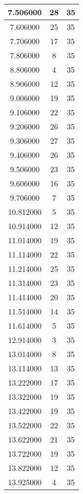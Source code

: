 \begin{longtable}[htbp]{|c|c|c|}
7.506000 & 28 & 35 \\ \hline
7.606000 & 25 & 35 \\ \hline
7.706000 & 17 & 35 \\ \hline
7.806000 & 8 & 35 \\ \hline
8.806000 & 4 & 35 \\ \hline
8.906000 & 12 & 35 \\ \hline
9.006000 & 19 & 35 \\ \hline
9.106000 & 22 & 35 \\ \hline
9.206000 & 26 & 35 \\ \hline
9.306000 & 27 & 35 \\ \hline
9.406000 & 26 & 35 \\ \hline
9.506000 & 23 & 35 \\ \hline
9.606000 & 16 & 35 \\ \hline
9.706000 & 7 & 35 \\ \hline
10.812000 & 5 & 35 \\ \hline
10.914000 & 12 & 35 \\ \hline
11.014000 & 19 & 35 \\ \hline
11.114000 & 22 & 35 \\ \hline
11.214000 & 25 & 35 \\ \hline
11.314000 & 23 & 35 \\ \hline
11.414000 & 20 & 35 \\ \hline
11.514000 & 14 & 35 \\ \hline
11.614000 & 5 & 35 \\ \hline
12.914000 & 3 & 35 \\ \hline
13.014000 & 8 & 35 \\ \hline
13.114000 & 13 & 35 \\ \hline
13.222000 & 17 & 35 \\ \hline
13.322000 & 19 & 35 \\ \hline
13.422000 & 19 & 35 \\ \hline
13.522000 & 22 & 35 \\ \hline
13.622000 & 21 & 35 \\ \hline
13.722000 & 19 & 35 \\ \hline
13.822000 & 12 & 35 \\ \hline
13.925000 & 4 & 35 \\ \hline
\end{longtable}
